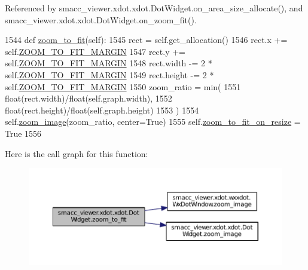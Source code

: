 Referenced by smacc\+\_\+viewer.\+xdot.\+xdot.\+Dot\+Widget.\+on\+\_\+area\+\_\+size\+\_\+allocate(), and smacc\+\_\+viewer.\+xdot.\+xdot.\+Dot\+Widget.\+on\+\_\+zoom\+\_\+fit().


\begin{DoxyCode}
1544     \textcolor{keyword}{def }\hyperlink{classsmacc__viewer_1_1xdot_1_1xdot_1_1DotWidget_a52852977b8266649f643aabe89b5355e}{zoom\_to\_fit}(self):
1545         rect = self.get\_allocation()
1546         rect.x += self.\hyperlink{classsmacc__viewer_1_1xdot_1_1xdot_1_1DotWidget_a2b9e2bf1dbf6eb9fa2311e8762387606}{ZOOM\_TO\_FIT\_MARGIN}
1547         rect.y += self.\hyperlink{classsmacc__viewer_1_1xdot_1_1xdot_1_1DotWidget_a2b9e2bf1dbf6eb9fa2311e8762387606}{ZOOM\_TO\_FIT\_MARGIN}
1548         rect.width -= 2 * self.\hyperlink{classsmacc__viewer_1_1xdot_1_1xdot_1_1DotWidget_a2b9e2bf1dbf6eb9fa2311e8762387606}{ZOOM\_TO\_FIT\_MARGIN}
1549         rect.height -= 2 * self.\hyperlink{classsmacc__viewer_1_1xdot_1_1xdot_1_1DotWidget_a2b9e2bf1dbf6eb9fa2311e8762387606}{ZOOM\_TO\_FIT\_MARGIN}
1550         zoom\_ratio = min(
1551             float(rect.width)/float(self.graph.width),
1552             float(rect.height)/float(self.graph.height)
1553         )
1554         self.\hyperlink{classsmacc__viewer_1_1xdot_1_1xdot_1_1DotWidget_a59e85f20fa9e43ffdeb3a3982061ca5d}{zoom\_image}(zoom\_ratio, center=\textcolor{keyword}{True})
1555         self.\hyperlink{classsmacc__viewer_1_1xdot_1_1xdot_1_1DotWidget_ab593e704812a8e15cde5ac909458fb91}{zoom\_to\_fit\_on\_resize} = \textcolor{keyword}{True}
1556 
\end{DoxyCode}


Here is the call graph for this function\+:
\nopagebreak
\begin{figure}[H]
\begin{center}
\leavevmode
\includegraphics[width=350pt]{classsmacc__viewer_1_1xdot_1_1xdot_1_1DotWidget_a52852977b8266649f643aabe89b5355e_cgraph}
\end{center}
\end{figure}




